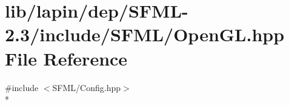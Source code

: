 \hypertarget{lapin_2dep_2_s_f_m_l-2_83_2include_2_s_f_m_l_2_open_g_l_8hpp}{\section{lib/lapin/dep/\-S\-F\-M\-L-\/2.3/include/\-S\-F\-M\-L/\-Open\-G\-L.hpp File Reference}
\label{lapin_2dep_2_s_f_m_l-2_83_2include_2_s_f_m_l_2_open_g_l_8hpp}
}
{\ttfamily \#include $<$S\-F\-M\-L/\-Config.\-hpp$>$}\\*
